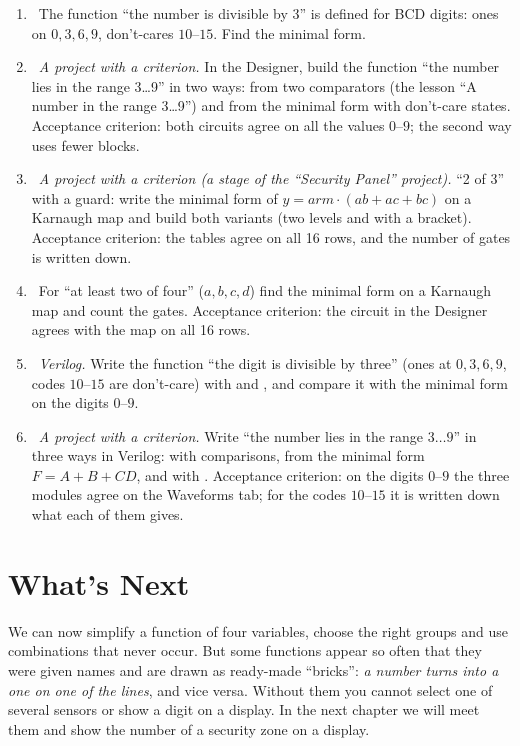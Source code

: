 \begin{taskbox}
\begin{enumerate}
  \item {}~The function ``the number is divisible by 3'' is defined for BCD digits: ones on $0,3,6,9$, don't-cares $10$--$15$. Find the minimal form.
  \item {}~\emph{A project with a criterion.} In the Designer, build the function ``the number lies in the range 3\ldots 9'' in two ways: from two comparators (the lesson ``A number in the range 3\ldots 9'') and from the minimal form with don't-care states. Acceptance criterion: both circuits agree on all the values $0$--$9$; the second way uses fewer blocks.
  \item {}~\emph{A project with a criterion (a stage of the ``Security Panel'' project).} ``2 of 3'' with a guard: write the minimal form of $y=arm\cdot(ab+ac+bc)$ on a Karnaugh map and build both variants (two levels and with a bracket). Acceptance criterion: the tables agree on all 16 rows, and the number of gates is written down.
  \item {}~For ``at least two of four'' ($a,b,c,d$) find the minimal form on a Karnaugh map and count the gates. Acceptance criterion: the circuit in the Designer agrees with the map on all 16 rows.
  \item {}~\emph{Verilog.} Write the function ``the digit is divisible by three'' (ones at $0,3,6,9$, codes $10$--$15$ are don't-care) with  and , and compare it with the minimal form on the digits $0$--$9$.
  \item {}~\emph{A project with a criterion.} Write ``the number lies in the range $3\ldots9$'' in three ways in Verilog: with comparisons, from the minimal form $F=A+B+CD$, and with . Acceptance criterion: on the digits $0$--$9$ the three modules agree on the Waveforms tab; for the codes $10$--$15$ it is written down what each of them gives.
\end{enumerate}
\end{taskbox}

\section{What's Next}

We can now simplify a function of four variables, choose the right groups and
use combinations that never occur. But some functions appear so often that
they were given names and are drawn as ready-made ``bricks'':
\emph{a number turns into a one on one of the lines}, and vice versa. Without
them you cannot select one of several sensors or show a digit on a display. In
the next chapter we will meet them and show the number of a security zone on
a display.
